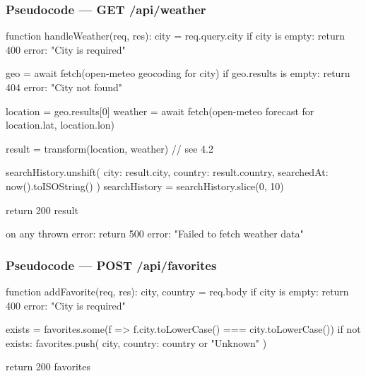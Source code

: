 \documentclass[11pt,letterpaper]{article}
\begin{document}
\subsubsection*{Pseudocode --- GET /api/weather}
\begin{codeblock}
function handleWeather(req, res):
    city = req.query.city
    if city is empty:
        return 400 { error: "City is required" }

    geo = await fetch(open-meteo geocoding for city)
    if geo.results is empty:
        return 404 { error: "City not found" }

    location = geo.results[0]
    weather  = await fetch(open-meteo forecast for location.lat, location.lon)

    result = transform(location, weather)         // see  4.2

    searchHistory.unshift({
        city: result.city, country: result.country,
        searchedAt: now().toISOString()
    })
    searchHistory = searchHistory.slice(0, 10)

    return 200 result

    on any thrown error:
        return 500 { error: "Failed to fetch weather data" }
\end{codeblock}

\subsubsection*{Pseudocode --- POST /api/favorites}
\begin{codeblock}
function addFavorite(req, res):
    { city, country } = req.body
    if city is empty:
        return 400 { error: "City is required" }

    exists = favorites.some(f => f.city.toLowerCase() === city.toLowerCase())
    if not exists:
        favorites.push({ city, country: country or "Unknown" })

    return 200 favorites
\end{codeblock}
\end{document}
